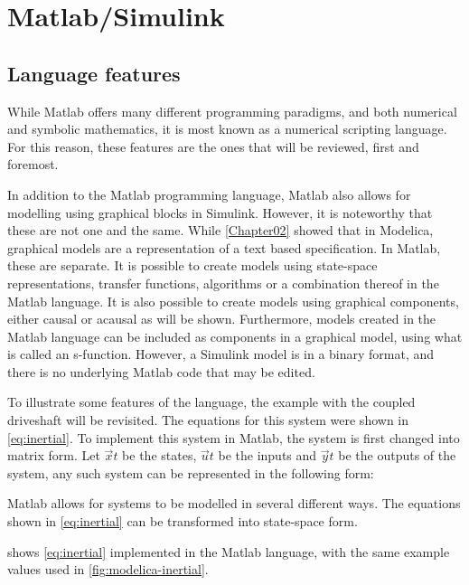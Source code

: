 \documentclass[\rootfolder/main.tex]{subfiles}
\begin{document}
\chapter{Matlab/Simulink} %

\label{Chapter03} %

\section{Language features}

While Matlab offers many different programming paradigms, and both numerical and symbolic mathematics, it is most known as a numerical scripting language.
For this reason, these features are the ones that will be reviewed, first and foremost.

In addition to the Matlab programming language, Matlab also allows for modelling using graphical blocks in Simulink.
However, it is noteworthy that these are not one and the same.
While \cref{Chapter02} showed that in Modelica, graphical models are a representation of a text based specification.
In Matlab, these are separate.
It is possible to create models using state-space representations, transfer functions, algorithms or a combination thereof in the Matlab language.
It is also possible to create models using graphical components, either causal or acausal as will be shown.
Furthermore, models created in the Matlab language can be included as components in a graphical model, using what is called an s-function.
However, a Simulink model is in a binary format, and there is no underlying Matlab code that may be edited.

To illustrate some features of the language, the example with the coupled driveshaft will be revisited.
The equations for this system were shown in \cref{eq:inertial}.
To implement this system in Matlab, the system is first changed into matrix form.
Let $\vec{x}{t}$ be the states, $\vec{u}{t}$ be the inputs and $\vec{y}{t}$ be the outputs of the system, any such system can be represented in the following form:


Matlab allows for systems to be modelled in several different ways.
The equations shown in \cref{eq:inertial} can be transformed into state-space form.

 shows \cref{eq:inertial} implemented in the Matlab language, with the same example values used in \cref{fig:modelica-inertial}.
\end{document}
